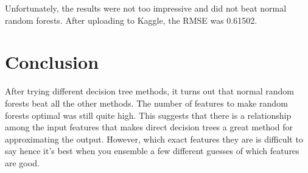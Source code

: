 \documentclass[twoside,11pt]{article}
\theoremstyle{definition}
\begin{document}
Unfortunately, the results were not too impressive and did not beat normal random forests. After uploading to Kaggle, the RMSE was 0.61502. 

\newpage

\section*{Conclusion}

After trying different decision tree methods, it turns out that normal random forests beat all the other methods. The number of features to make random forests optimal was still quite high. This suggests that there is a relationship among the input features that makes direct decision trees a great method for approximating the output. However, which exact features they are is difficult to say hence it's best when you ensemble a few different guesses of which features are good. 
\end{document}
